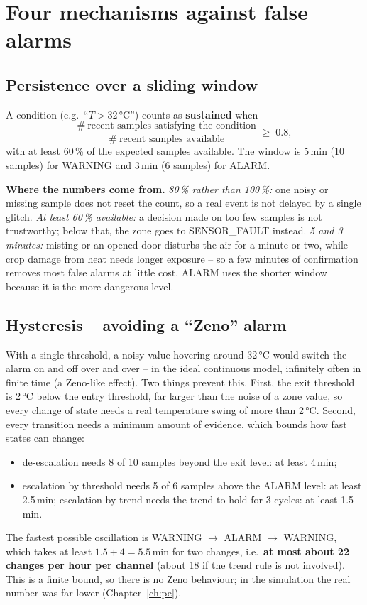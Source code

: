 \documentclass[11pt,a4paper]{report}
\newcommand{\why}[1]{\par\noindent\colorbox{gray!10}{\parbox{\dimexpr\linewidth-2\fboxsep}{\small\textbf{Where the numbers come from.} #1}}\par}
\begin{document}
\section{Four mechanisms against false alarms}\label{sec:persist}
\subsection{Persistence over a sliding window}
A condition (e.g.\ ``$T > 32$\,°C'') counts as \textbf{sustained} when
\begin{equation}
  \frac{\#\ \text{recent samples satisfying the condition}}{\#\ \text{recent samples available}} \;\geq\; 0.8,
\end{equation}
with at least 60\,\% of the expected samples available.
The window is 5\,min (10 samples) for WARNING and 3\,min (6 samples) for ALARM.

\why{\emph{80\,\% rather than 100\,\%:} one noisy or missing sample does not reset the count, so a real event is not delayed by a single glitch. \emph{At least 60\,\% available:} a decision made on too few samples is not trustworthy; below that, the zone goes to SENSOR\_FAULT instead. \emph{5 and 3 minutes:} misting or an opened door disturbs the air for a minute or two, while crop damage from heat needs longer exposure -- so a few minutes of confirmation removes most false alarms at little cost. ALARM uses the shorter window because it is the more dangerous level.}

\subsection{Hysteresis -- avoiding a ``Zeno'' alarm}
With a single threshold, a noisy value hovering around 32\,°C would switch the alarm on and off over and over -- in the ideal continuous model, infinitely often in finite time (a Zeno-like effect). Two things prevent this. First, the exit threshold is 2\,°C below the entry threshold, far larger than the noise of a zone value, so every change of state needs a real temperature swing of more than 2\,°C. Second, every transition needs a minimum amount of evidence, which bounds how fast states can change:
\begin{itemize}[noitemsep]
  \item de-escalation needs 8 of 10 samples beyond the exit level: at least 4\,min;
  \item escalation by threshold needs 5 of 6 samples above the ALARM level: at least 2.5\,min; escalation by trend needs the trend to hold for 3 cycles: at least 1.5\,min.
\end{itemize}
The fastest possible oscillation is WARNING $\to$ ALARM $\to$ WARNING, which takes at least $1.5 + 4 = 5.5$\,min for two changes, i.e.\ \textbf{at most about 22 changes per hour per channel} (about 18 if the trend rule is not involved). This is a finite bound, so there is no Zeno behaviour; in the simulation the real number was far lower (Chapter~\ref{ch:pe}).
\end{document}
